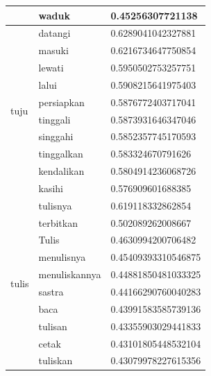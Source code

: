 \begin{enumerate}
\begin{longtable}[c]{|l|l|l|}
                                  & waduk           & 0.45256307721138    \\ \hline
    \multirow[t]{10}{*}{tuju}     & datangi         & 0.6289041042327881  \\ \cline{2-3}
                                  & masuki          & 0.6216734647750854  \\ \cline{2-3}
                                  & lewati          & 0.5950502753257751  \\ \cline{2-3}
                                  & lalui           & 0.5908215641975403  \\ \cline{2-3}
                                  & persiapkan      & 0.5876772403717041  \\ \cline{2-3}
                                  & tinggali        & 0.5873931646347046  \\ \cline{2-3}
                                  & singgahi        & 0.5852357745170593  \\ \cline{2-3}
                                  & tinggalkan      & 0.583324670791626   \\ \cline{2-3}
                                  & kendalikan      & 0.5804914236068726  \\ \cline{2-3}
                                  & kasihi          & 0.576909601688385   \\ \hline
    \multirow[t]{10}{*}{tulis}    & tulisnya        & 0.619118332862854   \\ \cline{2-3}
                                  & terbitkan       & 0.502089262008667   \\ \cline{2-3}
                                  & Tulis           & 0.4630994200706482  \\ \cline{2-3}
                                  & menulisnya      & 0.45409393310546875 \\ \cline{2-3}
                                  & menuliskannya   & 0.44881850481033325 \\ \cline{2-3}
                                  & sastra          & 0.44166290760040283 \\ \cline{2-3}
                                  & baca            & 0.43991583585739136 \\ \cline{2-3}
                                  & tulisan         & 0.43355903029441833 \\ \cline{2-3}
                                  & cetak           & 0.43101805448532104 \\ \cline{2-3}
                                  & tuliskan        & 0.43079978227615356 \\ \hline

\end{longtable}
\end{enumerate}
